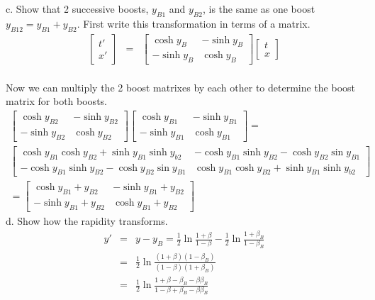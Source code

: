 \documentclass[11pt]{amsart}
\begin{document}
c. Show that 2 successive boosts, $y_{B1}$ and $y_{B2}$, is the same as one boost $y_{B12}=y_{B1}+y_{B2}$. First write this transformation in terms of a matrix. \\
\begin{eqnarray*} 
\begin{bmatrix}
t' \\
x' 
\end{bmatrix} &=& \begin{bmatrix}
	\cosh{y_{B}} & -\sinh{y_{B}} \\
	-\sinh{y_{B}} & \cosh{y_{B}} 
	\end{bmatrix}\begin{bmatrix}
	t \\
	x 
	\end{bmatrix} 
\end{eqnarray*} \\
Now we can multiply the 2 boost matrixes by each other to determine the boost matrix for both boosts. \\
\begin{eqnarray*}
\begin{bmatrix}
	\cosh{y_{B2}} & -\sinh{y_{B2}} \\
	-\sinh{y_{B2}} & \cosh{y_{B2}} 
	\end{bmatrix}\begin{bmatrix}
	\cosh{y_{B1}} & -\sinh{y_{B1}} \\
	-\sinh{y_{B1}} & \cosh{y_{B1}} 
	\end{bmatrix} = \\
 \begin{bmatrix}
	\cosh{y_{B1}}\cosh{y_{B2}}+\sinh{y_{B1}}\sinh{y_{b2}} & -\cosh{y_{B1}}\sinh{y_{B2}}-\cosh{y_{B2}}\sin{y_{B1}} \\
	-\cosh{y_{B1}}\sinh{y_{B2}}-\cosh{y_{B2}}\sin{y_{B1}} & \cosh{y_{B1}}\cosh{y_{B2}}+\sinh{y_{B1}}\sinh{y_{b2}}
	\end{bmatrix} \\
= \begin{bmatrix}
	\cosh{y_{B1}+y_{B2}} & -\sinh{y_{B1}+y_{B2}} \\
	-\sinh{y_{B1}+y_{B2}} & \cosh{y_{B1}+y_{B2}} 
	\end{bmatrix}
	\end{eqnarray*} 
d. Show how the rapidity transforms. \\
\begin{eqnarray*}
y' &=& y-y_{B} = \frac{1}{2}\ln{\frac{1+\beta}{1-\beta}}-\frac{1}{2}\ln{\frac{1+\beta_{B}}{1-\beta_{B}}} \\
&=& \frac{1}{2}\ln{\frac{(1+\beta)(1-\beta_{B})}{(1-\beta)(1+\beta_{B})}} \\
&=& \frac{1}{2}\ln{\frac{1+\beta-\beta_{B}-\beta\beta_{B}}{1-\beta+\beta_{B}-\beta\beta_{B}}} 
\end{eqnarray*} \\
\end{document}
